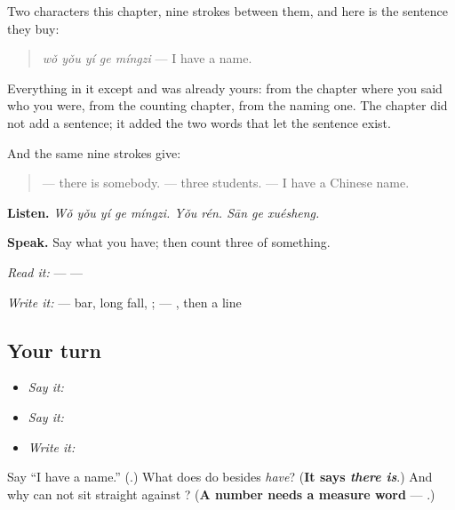 \begin{grammarlens}[title={What you've built — have, and count}]
Two characters this chapter, nine strokes between them, and here is the sentence they buy:

\begin{quote}
\textbf{} \emph{wǒ yǒu yí ge míngzi} — I have a name.
\end{quote}

Everything in it except  and  was already yours:  from the chapter where you said who you were,  from the counting chapter,  from the naming one. The chapter did not add a sentence; it added the two words that let the sentence exist.

And the same nine strokes give:

\begin{quote}
\textbf{} — there is somebody. \textbf{} — three students. \textbf{} — I have a Chinese name.
\end{quote}

\textbf{Listen.} \emph{Wǒ yǒu yí ge míngzi. Yǒu rén. Sān ge xuésheng.}

\textbf{Speak.} Say what you have; then count three of something.

\emph{Read it:}  —  — 

\emph{Write it:}  — bar, long fall, ;  — , then a line
\end{grammarlens}

\subsection*{Your turn}
\begin{itemize}
\raggedright
  \item \emph{Say it:} 
  \item \emph{Say it:}  
  \item \emph{Write it:}  
\end{itemize}

\begin{tcolorbox}[breakable,colback=teal!4,colframe=teal!35!black,title={Before you move on}]
Say \textquotedblleft{}I have a name.\textquotedblright{} (\textbf{}.) What does  do besides \emph{have}? (\textbf{It says \emph{there is}}.) And why can  not sit straight against ? (\textbf{A number needs a measure word} — .)
\end{tcolorbox}
